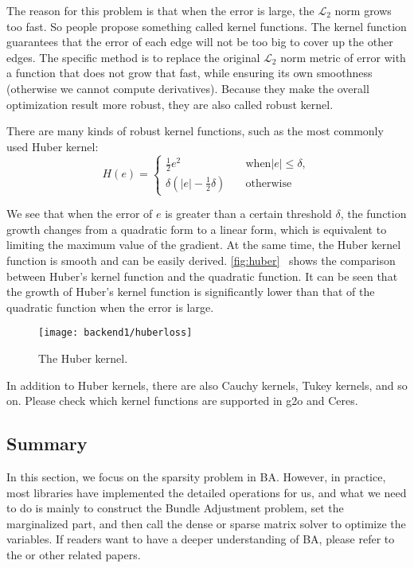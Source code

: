 The reason for this problem is that when the error is large, the $\mathcal{L}_2$ norm grows too fast. So people propose something called kernel functions. The kernel function guarantees that the error of each edge will not be too big to cover up the other edges. The specific method is to replace the original  $\mathcal{L}_2$ norm metric of error with a function that does not grow that fast, while ensuring its own smoothness (otherwise we cannot compute derivatives). Because they make the overall optimization result more robust, they are also called robust kernel.

There are many kinds of robust kernel functions, such as the most commonly used Huber kernel:
\begin{equation}
	H\left( e \right) = 
	\left\{ 
	\begin{array}{ll}
		\frac{1}{2}{e^2} &\quad \text{when} |e| \leqslant \delta, \\
		\delta \left( {\left| e \right| - \frac{1}{2}\delta } \right) &\quad \text{otherwise}
	\end{array} \right.
\end{equation}

We see that when the error of $e$ is greater than a certain threshold $\delta$, the function growth changes from a quadratic form to a linear form, which is equivalent to limiting the maximum value of the gradient. At the same time, the Huber kernel function is smooth and can be easily derived. \autoref{fig:huber}~ shows the comparison between Huber's kernel function and the quadratic function. It can be seen that the growth of Huber's kernel function is significantly lower than that of the quadratic function when the error is large.

\begin{figure}[!htp]
	\centering
	\texttt{[image: backend1/huberloss]}
	\caption{The Huber kernel.}
	\label{fig:huber}
\end{figure}

In addition to Huber kernels, there are also Cauchy kernels, Tukey kernels, and so on. Please check which kernel functions are supported in g2o and Ceres.

\subsection{Summary}
In this section, we focus on the sparsity problem in BA. However, in practice, most libraries have implemented the detailed operations for us, and what we need to do is mainly to construct the Bundle Adjustment problem, set the marginalized part, and then call the dense or sparse matrix solver to optimize the variables. If readers want to have a deeper understanding of BA, please refer to the \cite{Triggs2000} or other related papers. 

